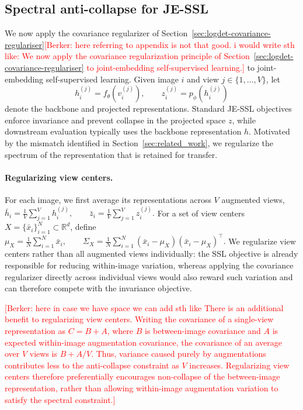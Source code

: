 \documentclass{article} %
\theoremstyle{remark}
\newcommand{\BD}[1]{\textcolor{red}{[Berker: #1]}}
\begin{document}
\subsection{Spectral anti-collapse for JE-SSL}
\label{sec:ssl}

We now apply the covariance regularizer of Section~\ref{sec:logdet-covariance-regulariser}\BD{here referring to appendix is not that good. i would write sth like: We now apply the covariance regularization principle of Section~\ref{sec:logdet-covariance-regulariser} to joint-embedding self-supervised learning.} to joint-embedding self-supervised learning. 
Given image $i$ and view $j\in\{1,\ldots,V\}$, let
\[
h_i^{(j)} = f_\theta(v_i^{(j)}),
\qquad
z_i^{(j)} = p_\phi(h_i^{(j)})
\]
denote the backbone and projected representations.
Standard JE-SSL objectives enforce invariance and prevent collapse in the projected space $z$, while downstream evaluation typically uses the backbone representation $h$. 
Motivated by the mismatch identified in Section~\ref{sec:related_work}, we regularize the spectrum of the representation that is retained for transfer.

\paragraph{Regularizing view centers.}
For each image, we first average its representations across $V$ augmented views, $\bar h_i=\frac{1}{V}\sum_{j=1}^{V} h_i^{(j)},
\qquad
\bar z_i=\frac{1}{V}\sum_{j=1}^{V} z_i^{(j)}. $
For a set of view centers
$X=\{\bar x_i\}_{i=1}^{N}\subset\mathbb{R}^d$, define
$\mu_X=\frac{1}{N}\sum_{i=1}^{N}\bar x_i,
\qquad
\Sigma_X=\frac{1}{N}\sum_{i=1}^{N}
(\bar x_i-\mu_X)(\bar x_i-\mu_X)^\top . $
We regularize view centers rather than all augmented views individually: the SSL objective is already responsible for reducing within-image variation, whereas applying the covariance regularizer directly across individual views would also reward such variation and can therefore compete with the invariance objective.

\BD{here in case we have space we can add sth like There is an additional benefit to regularizing view centers. Writing the covariance of a single-view representation as \(C=B+A\), where \(B\) is between-image covariance and \(A\) is expected within-image augmentation covariance, the covariance of an average over \(V\) views is \(B+A/V\). Thus, variance caused purely by augmentations contributes less to the anti-collapse constraint as \(V\) increases. Regularizing view centers therefore preferentially encourages non-collapse of the between-image representation, rather than allowing within-image augmentation variation to satisfy the spectral constraint.}
\end{document}
